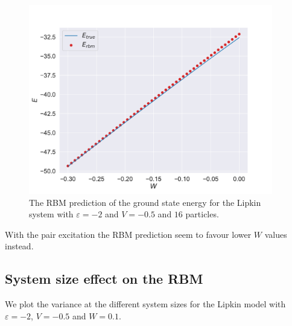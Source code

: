 \begin{figure}[H]
  \begin{center}
    \includegraphics[width=0.95\textwidth]{Figures/Plots/Lipkin/val-true[W][-0.3-0.0][e=850][n=16][eps=-2][V=-0.5].pdf}
  \end{center}
  \caption{The RBM prediction of the ground state energy for the Lipkin system with $\varepsilon=-2$ and $V=-0.5$ and $16$ particles.}
\end{figure}

With the pair excitation the RBM prediction seem to favour lower $W$ values instead.

\subsection{System size effect on the RBM}

We plot the variance at the different system sizes for the Lipkin model with $\varepsilon =-2$, $V=-0.5$ and $W=0.1$.

